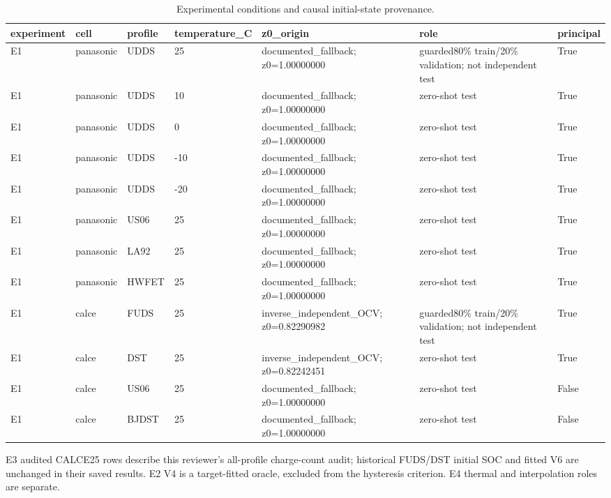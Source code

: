 \begin{table}[!t]
\centering
\footnotesize
\caption{Experimental conditions and causal initial-state provenance.}
\label{tab:reviewer-conditions-1}
\setlength{\tabcolsep}{3pt}
\begin{tabular}{llll p{} p{} l}
\toprule
experiment & cell & profile & temperature\_C & z0\_origin & role & principal \\
\midrule
E1 & panasonic & UDDS & 25 & documented\_fallback; z0=1.00000000 & guarded80\% train/20\% validation; not independent test & True \\
E1 & panasonic & UDDS & 10 & documented\_fallback; z0=1.00000000 & zero-shot test & True \\
E1 & panasonic & UDDS & 0 & documented\_fallback; z0=1.00000000 & zero-shot test & True \\
E1 & panasonic & UDDS & -10 & documented\_fallback; z0=1.00000000 & zero-shot test & True \\
E1 & panasonic & UDDS & -20 & documented\_fallback; z0=1.00000000 & zero-shot test & True \\
E1 & panasonic & US06 & 25 & documented\_fallback; z0=1.00000000 & zero-shot test & True \\
E1 & panasonic & LA92 & 25 & documented\_fallback; z0=1.00000000 & zero-shot test & True \\
E1 & panasonic & HWFET & 25 & documented\_fallback; z0=1.00000000 & zero-shot test & True \\
E1 & calce & FUDS & 25 & inverse\_independent\_OCV; z0=0.82290982 & guarded80\% train/20\% validation; not independent test & True \\
E1 & calce & DST & 25 & inverse\_independent\_OCV; z0=0.82242451 & zero-shot test & True \\
E1 & calce & US06 & 25 & documented\_fallback; z0=1.00000000 & zero-shot test & False \\
E1 & calce & BJDST & 25 & documented\_fallback; z0=1.00000000 & zero-shot test & False \\
\bottomrule
\end{tabular}
\par\smallskip\begin{minipage}{0.98\textwidth}\footnotesize E3 audited CALCE25 rows describe this reviewer's all-profile charge-count audit; historical FUDS/DST initial SOC and fitted V6 are unchanged in their saved results. E2 V4 is a target-fitted oracle, excluded from the hysteresis criterion. E4 thermal and interpolation roles are separate.\end{minipage}
\end{table}


